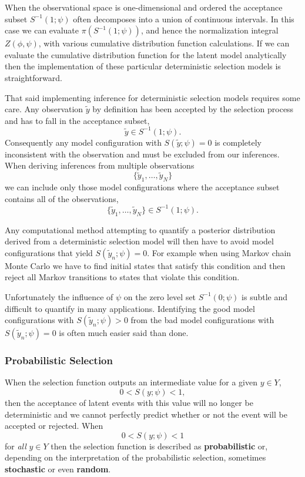 \documentclass[
  letterpaper,
  DIV=11,
  numbers=noendperiod]{scrartcl}
\begin{document}
When the observational space is one-dimensional and ordered the
acceptance subset \(S^{-1}(1; \psi)\) often decomposes into a union of
continuous intervals. In this case we can evaluate
\(\pi ( S^{-1}(1; \psi) )\), and hence the normalization integral
\(Z(\phi, \psi)\), with various cumulative distribution function
calculations. If we can evaluate the cumulative distribution function
for the latent model analytically then the implementation of these
particular deterministic selection models is straightforward.

That said implementing inference for deterministic selection models
requires some care. Any observation \(\tilde{y}\) by definition has been
accepted by the selection process and has to fall in the acceptance
subset, \[
\tilde{y} \in S^{-1}(1; \psi).
\] Consequently any model configuration with \(S(\tilde{y}; \psi) = 0\)
is completely inconsistent with the observation and must be excluded
from our inferences. When deriving inferences from multiple observations
\[
\{ \tilde{y}_{1}, \ldots, \tilde{y}_{N} \}
\] we can include only those model configurations where the acceptance
subset contains all of the observations, \[
\{ \tilde{y}_{1}, \ldots, \tilde{y}_{N} \} \in S^{-1}(1; \psi).
\]

Any computational method attempting to quantify a posterior distribution
derived from a deterministic selection model will then have to avoid
model configurations that yield \(S(\tilde{y}_{n}; \psi) = 0\). For
example when using Markov chain Monte Carlo we have to find initial
states that satisfy this condition and then reject all Markov
transitions to states that violate this condition.

Unfortunately the influence of \(\psi\) on the zero level set
\(S^{-1}(0; \psi)\) is subtle and difficult to quantify in many
applications. Identifying the good model configurations with
\(S(\tilde{y}_{n}; \psi) > 0\) from the bad model configurations with
\(S(\tilde{y}_{n}; \psi) = 0\) is often much easier said than done.

\subsubsection{Probabilistic Selection}\label{probabilistic-selection}

When the selection function outputs an intermediate value for a given
\(y \in Y\), \[
0 < S(y; \psi) < 1,
\] then the acceptance of latent events with this value will no longer
be deterministic and we cannot perfectly predict whether or not the
event will be accepted or rejected. When \[
0 < S(y; \psi) < 1
\] for \emph{all} \(y \in Y\) then the selection function is described
as \textbf{probabilistic} or, depending on the interpretation of the
probabilistic selection, sometimes \textbf{stochastic} or even
\textbf{random}.
\end{document}

